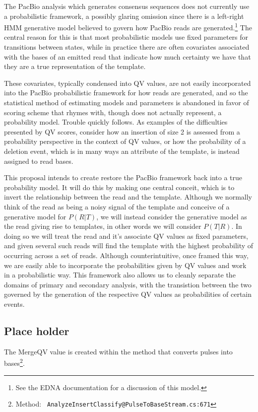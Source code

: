 \documentclass[fleqn,10pt]{SelfArx} %
\begin{document}
The PacBio analysis which generates consensus sequences does not currently use a probabilistic framework, a possibly glaring omission since there is a left-right HMM generative model believed to govern how PacBio reads are generated.\footnote{See the EDNA documentation for a discussion of this model.}  The central reason for this is that most probabilistic models use fixed parameters for transitions between states, while in practice there are often covariates associated with the bases of an emitted read that indicate how much certainty we have that they are a true representation of the template.

These covariates, typically condensed into QV values, are not easily incorporated into the PacBio probabilistic framework for how reads are generated, and so the statistical method of estimating models and parameters is abandoned in favor of scoring scheme that rhymes with, though does not actually represent, a probability model.  Trouble quickly follows.  As examples of the difficulties presented by QV scores, consider how an insertion of size 2 is assessed from a probability perspective in the context of QV values, or how the probability of a deletion event, which is in many ways an attribute of the template, is instead assigned to read bases.

This proposal intends to create restore the PacBio framework back into a true probability model.  It will do this by making one central conceit, which is to invert the relationship between the read and the template.  Although we normally think of the read as being a noisy signal of the template and conceive of a generative model for $P(R|T)$, we will instead consider the generative model as the read giving rise to templates, in other words we will consider $P(T|R)$.  In doing so we will treat the read and it's associate QV values as fixed parameters, and given several such reads will find the template with the highest probability of occurring across a set of reads.  Although counterintuitive, once framed this way, we are easily able to incorporate the probabilities given by QV values and work in a probabilistic way.  This framework also allows us to cleanly separate the domains of primary and secondary analysis, with the transistion between the two governed by the generation of the respective QV values as probabilities of certain events. 



\subsection{Place holder}
The MergeQV value is created within the method that converts pulses into bases\footnote{Method: \texttt{ AnalyzeInsertClassify@PulseToBaseStream.cs:671}}.
\end{document}
